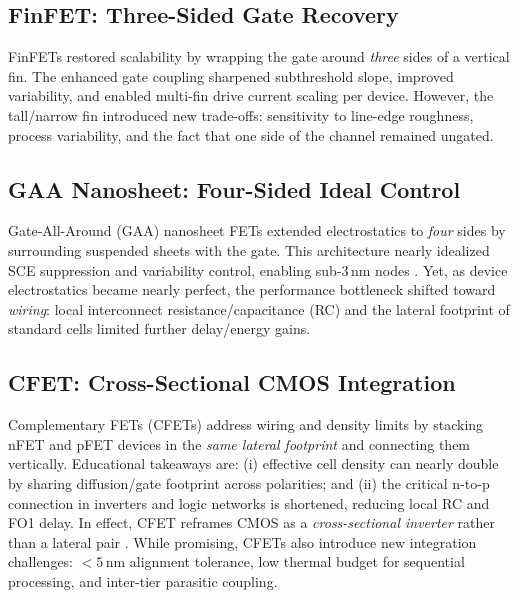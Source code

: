 \documentclass[conference]{IEEEtran}
\begin{document}
\subsection{FinFET: Three-Sided Gate Recovery}
FinFETs restored scalability by wrapping the gate around
\emph{three} sides of a vertical fin. The enhanced gate coupling
sharpened subthreshold slope, improved variability, and enabled
multi-fin drive current scaling per device. However, the tall/narrow
fin introduced new trade-offs: sensitivity to line-edge roughness,
process variability, and the fact that one side of the channel
remained ungated.

\subsection{GAA Nanosheet: Four-Sided Ideal Control}
Gate-All-Around (GAA) nanosheet FETs extended electrostatics to
\emph{four} sides by surrounding suspended sheets with the gate.
This architecture nearly idealized SCE suppression and variability control,
enabling sub-3\,nm nodes \cite{bsimcmg_sispad2017,loubet_imec_vlsi2019}.
Yet, as device electrostatics became nearly perfect, the performance bottleneck
shifted toward \emph{wiring}: local interconnect resistance/capacitance
(RC) and the lateral footprint of standard cells limited further
delay/energy gains.

\subsection{CFET: Cross-Sectional CMOS Integration}
Complementary FETs (CFETs) address wiring and density limits by stacking
nFET and pFET devices in the \emph{same lateral footprint} and
connecting them vertically. Educational takeaways are:
(i) effective cell density can nearly double by sharing
diffusion/gate footprint across polarities; and
(ii) the critical n-to-p connection in inverters and logic networks is
shortened, reducing local RC and FO1 delay.
In effect, CFET reframes CMOS as a \emph{cross-sectional inverter}
rather than a lateral pair \cite{imec_cfet_iedm2020,colinge_cfet_review2021}.
While promising, CFETs also introduce new integration challenges:
$<5$\,nm alignment tolerance, low thermal budget for sequential processing,
and inter-tier parasitic coupling.
\end{document}

